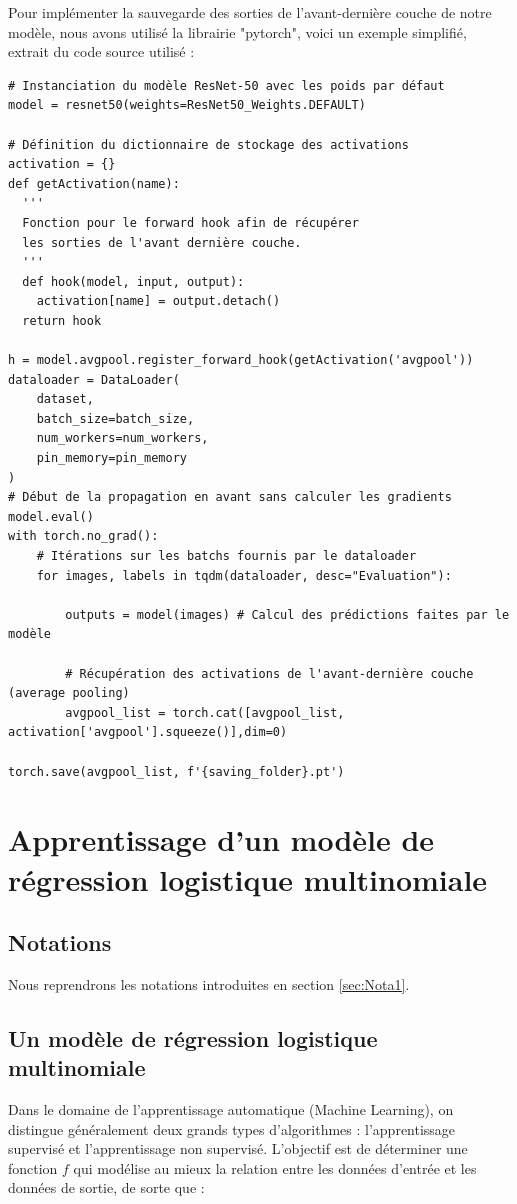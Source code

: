 \documentclass[12pt,english, openany]{book}
\begin{document}
Pour implémenter la sauvegarde des sorties de l'avant-dernière couche de notre modèle, nous avons utilisé la librairie "pytorch", voici un exemple simplifié, extrait du code source utilisé : 

\begin{verbatim}
# Instanciation du modèle ResNet-50 avec les poids par défaut
model = resnet50(weights=ResNet50_Weights.DEFAULT)

# Définition du dictionnaire de stockage des activations 
activation = {}
def getActivation(name):
  '''
  Fonction pour le forward hook afin de récupérer 
  les sorties de l'avant dernière couche.
  '''
  def hook(model, input, output):
    activation[name] = output.detach()
  return hook

h = model.avgpool.register_forward_hook(getActivation('avgpool'))
dataloader = DataLoader(
    dataset, 
    batch_size=batch_size, 
    num_workers=num_workers, 
    pin_memory=pin_memory
)
# Début de la propagation en avant sans calculer les gradients
model.eval()
with torch.no_grad():
    # Itérations sur les batchs fournis par le dataloader
    for images, labels in tqdm(dataloader, desc="Evaluation"):
        
        outputs = model(images) # Calcul des prédictions faites par le modèle

        # Récupération des activations de l'avant-dernière couche (average pooling)
        avgpool_list = torch.cat([avgpool_list, activation['avgpool'].squeeze()],dim=0) 
         
torch.save(avgpool_list, f'{saving_folder}.pt') 
\end{verbatim} 

\chapter{Apprentissage d'un modèle de régression logistique multinomiale}
\section{Notations}
Nous reprendrons les notations introduites en section \ref{sec:Nota1}.

\section{Un modèle de régression logistique multinomiale}
\label{sec:model_reg_log_multi}
Dans le domaine de l'apprentissage automatique (Machine Learning), on distingue généralement deux grands types d'algorithmes : l'apprentissage supervisé et l'apprentissage non supervisé. L'objectif est de déterminer une fonction $f$ qui modélise au mieux la relation entre les données d'entrée et les données de sortie, de sorte que :
\end{document}
